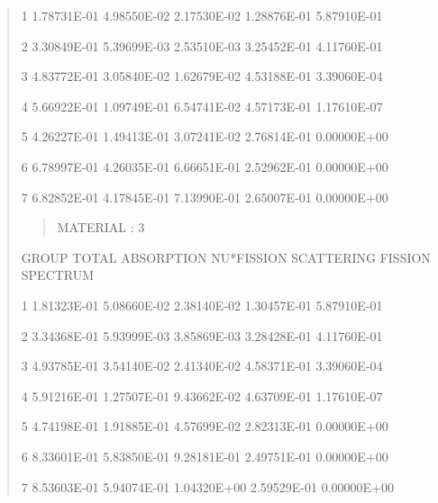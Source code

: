 \documentclass[letterpaper,10pt,english]{sphinxmanual}
\begin{document}
\begin{quote}
\begin{DUlineblock}{0em}
\item[] 1          1.78731E-01     4.98550E-02     2.17530E-02     1.28876E-01     5.87910E-01           \textbar{}
\item[] 2          3.30849E-01     5.39699E-03     2.53510E-03     3.25452E-01     4.11760E-01           \textbar{}
\item[] 3          4.83772E-01     3.05840E-02     1.62679E-02     4.53188E-01     3.39060E-04           \textbar{}
\item[] 4          5.66922E-01     1.09749E-01     6.54741E-02     4.57173E-01     1.17610E-07           \textbar{}
\item[] 5          4.26227E-01     1.49413E-01     3.07241E-02     2.76814E-01     0.00000E+00           \textbar{}
\item[] 6          6.78997E-01     4.26035E-01     6.66651E-01     2.52962E-01     0.00000E+00           \textbar{}
\item[] 7          6.82852E-01     4.17845E-01     7.13990E-01     2.65007E-01     0.00000E+00           \textbar{}
\end{DUlineblock}
\begin{quote}

MATERIAL :   3
\end{quote}

\begin{DUlineblock}{0em}
\item[] GROUP           TOTAL        ABSORPTION      NU*FISSION      SCATTERING      FISSION SPECTRUM       \textbar{}
\end{DUlineblock}

\begin{DUlineblock}{0em}
\item[] 1          1.81323E-01     5.08660E-02     2.38140E-02     1.30457E-01     5.87910E-01           \textbar{}
\item[] 2          3.34368E-01     5.93999E-03     3.85869E-03     3.28428E-01     4.11760E-01           \textbar{}
\item[] 3          4.93785E-01     3.54140E-02     2.41340E-02     4.58371E-01     3.39060E-04           \textbar{}
\item[] 4          5.91216E-01     1.27507E-01     9.43662E-02     4.63709E-01     1.17610E-07           \textbar{}
\item[] 5          4.74198E-01     1.91885E-01     4.57699E-02     2.82313E-01     0.00000E+00           \textbar{}
\item[] 6          8.33601E-01     5.83850E-01     9.28181E-01     2.49751E-01     0.00000E+00           \textbar{}
\item[] 7          8.53603E-01     5.94074E-01     1.04320E+00     2.59529E-01     0.00000E+00           \textbar{}
\end{DUlineblock}
\begin{quote}


\end{quote}
\end{quote}
\end{document}
